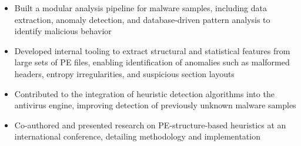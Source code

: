 \documentclass[a4paper]{article}
\begin{document}
\begin{cvExperience}
{\begin{cvJob}
\begin{itemize}
        \item Built a modular analysis pipeline for malware samples, including data
              extraction, anomaly detection, and database-driven pattern analysis to identify
              malicious behavior 

        \item Developed internal tooling to extract structural and statistical features from
              large sets of PE files, enabling identification of anomalies such as malformed
              headers, entropy irregularities, and suspicious section layouts 

        \item Contributed to the integration of heuristic detection algorithms into the
              antivirus engine, improving detection of previously unknown malware samples

        \item Co-authored and presented research on PE-structure-based heuristics at an
              international conference, detailing methodology and implementation

      \end{itemize}
    \end{cvJob}
  }


\end{cvExperience}
\end{document}
